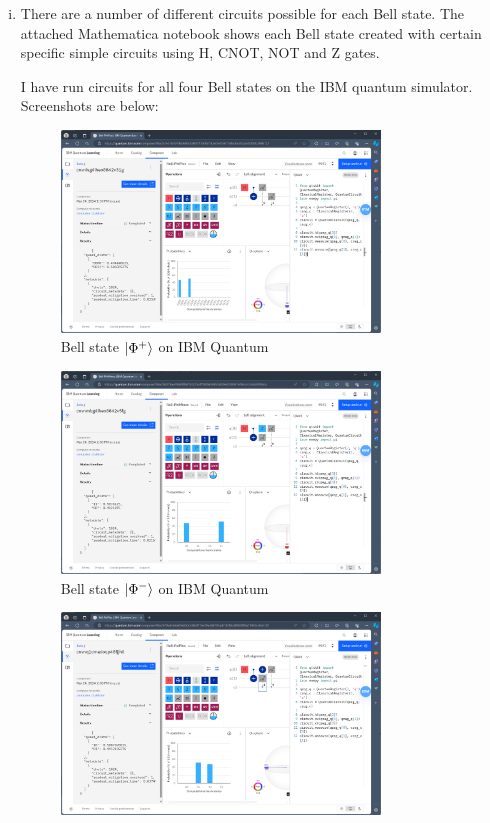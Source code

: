 \documentclass[12pt]{extarticle}
\begin{document}
\begin{enumerate}[(i)]
\item There are a number of different circuits possible for each Bell state.
The attached Mathematica notebook shows each Bell state created with
certain specific simple circuits using H, CNOT, NOT and Z gates.

I have run circuits for all four Bell states on the IBM quantum simulator.
Screenshots are below:

\begin{figure}[H]
\centering
\includegraphics[width=0.80\textwidth]{images/Bell-PhiPlus-IBM-Quantum.png}
\caption{Bell state $\ket{\Phi^{+}}$ on IBM Quantum}
\end{figure}
\begin{figure}[H]
\centering
\includegraphics[width=0.80\textwidth]{images/Bell-PhiMinus-IBM-Quantum.png}
\caption{Bell state $\ket{\Phi^{-}}$ on IBM Quantum}
\end{figure}
\begin{figure}[H]
\centering
\includegraphics[width=0.80\textwidth]{images/Bell-PsiPlus-IBM-Quantum.png}

\end{figure}
\end{enumerate}
\end{document}
